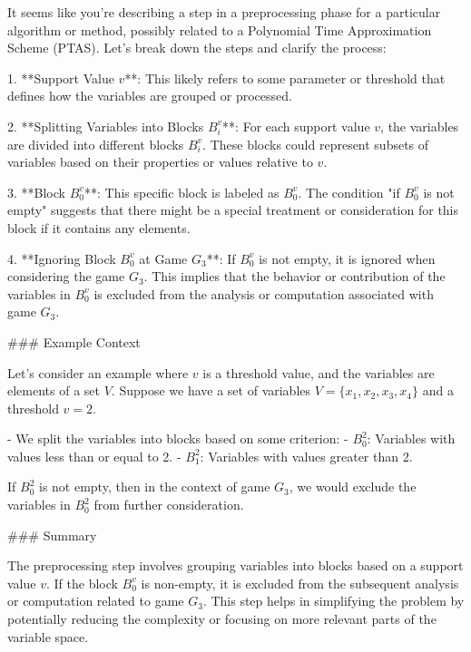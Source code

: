 It seems like you're describing a step in a preprocessing phase for a particular algorithm or method, possibly related to a Polynomial Time Approximation Scheme (PTAS). Let's break down the steps and clarify the process:

1. **Support Value \( v \)**: This likely refers to some parameter or threshold that defines how the variables are grouped or processed.

2. **Splitting Variables into Blocks \( B^v_i \)**: For each support value \( v \), the variables are divided into different blocks \( B^v_i \). These blocks could represent subsets of variables based on their properties or values relative to \( v \).

3. **Block \( B^v_0 \)**: This specific block is labeled as \( B^v_0 \). The condition "if \( B^v_0 \) is not empty" suggests that there might be a special treatment or consideration for this block if it contains any elements.

4. **Ignoring Block \( B^v_0 \) at Game \( G_3 \)**: If \( B^v_0 \) is not empty, it is ignored when considering the game \( G_3 \). This implies that the behavior or contribution of the variables in \( B^v_0 \) is excluded from the analysis or computation associated with game \( G_3 \).

### Example Context

Let's consider an example where \( v \) is a threshold value, and the variables are elements of a set \( V \). Suppose we have a set of variables \( V = \{x_1, x_2, x_3, x_4\} \) and a threshold \( v = 2 \).

- We split the variables into blocks based on some criterion:
  - \( B^2_0 \): Variables with values less than or equal to 2.
  - \( B^2_1 \): Variables with values greater than 2.

If \( B^2_0 \) is not empty, then in the context of game \( G_3 \), we would exclude the variables in \( B^2_0 \) from further consideration.

### Summary

The preprocessing step involves grouping variables into blocks based on a support value \( v \). If the block \( B^v_0 \) is non-empty, it is excluded from the subsequent analysis or computation related to game \( G_3 \). This step helps in simplifying the problem by potentially reducing the complexity or focusing on more relevant parts of the variable space.